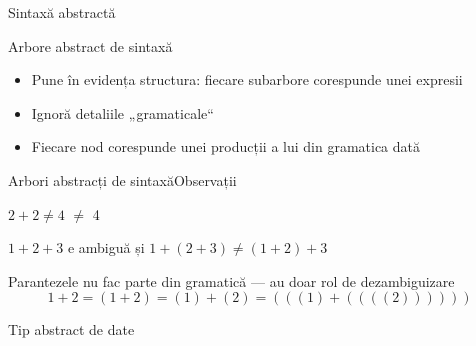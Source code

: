 \documentclass[xcolor=pdftex,romanian,colorlinks]{beamer}
\begin{document}
\begin{section}{Sintaxă abstractă}
\begin{frame}{Arbore abstract de sintaxă}
\begin{itemize}
\item Pune în evidența structura: fiecare subarbore corespunde unei expresii
\item Ignoră detaliile „gramaticale“
\item Fiecare nod corespunde unei producții a lui  din gramatica dată
\end{itemize}
\end{frame}

\begin{frame}{Arbori abstracți de sintaxă}{Observații}
\begin{block}{$2 + 2 \neq 4$}
\hfill
{}\hfill{\Large $\neq$}\hfill
4\hfill\;
\end{block}

\begin{block}{$1 + 2 + 3$ e ambiguă și $1 + (2 + 3) \neq (1 + 2) + 3$}
\hfill\begin{minipage}{.3\columnwidth}
\end{minipage}
\hfill
\begin{minipage}{.3\columnwidth}
\end{minipage}
\hfill\;
\end{block}

\begin{block}{Parantezele nu fac parte din gramatică --- au doar rol de dezambiguizare}
\[1 + 2 = (1 + 2) = (1) + (2) = (((1) + ((((2))))))\]
\end{block}
\end{frame}

\begin{subsection}{Tip abstract de date}


\end{subsection}
\end{section}
\end{document}
